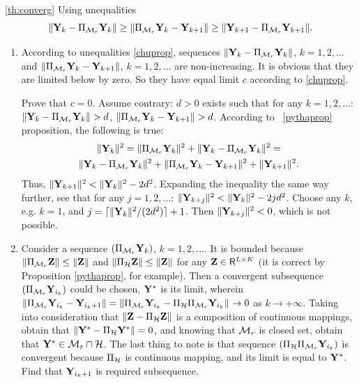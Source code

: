 \documentclass[12pt,a4paper,fleqn,leqno]{article}
\begin{document}
\begin{proof2}{\ref{th:converg}}
Using unequalities \cite{Chu.etal2003}
\begin{equation}
\label{chuprop}
\|\mathbf{Y}_k - \Pi_{\mathcal{M}_r} \mathbf{Y}_k\| \ge \|\Pi_{\mathcal{M}_r} \mathbf{Y}_k - \mathbf{Y}_{k + 1}\| \ge \|\mathbf{Y}_{k+1} - \Pi_{\mathcal{M}_r} \mathbf{Y}_{k + 1}\|.
\end{equation}

\begin{enumerate}
\item According to unequalities \eqref{chuprop}, sequences $\|\mathbf{Y}_k - \Pi_{\mathcal{M}_r} \mathbf{Y}_k\|$, $k = 1, 2, \ldots$ and $\|\Pi_{\mathcal{M}_r} \mathbf{Y}_k - \mathbf{Y}_{k + 1}\|$, $k = 1, 2, \ldots$ are non-increasing. It is obvious that they are limited below by zero. So they have equal limit $c$ according to \eqref{chuprop}.

Prove that $c = 0$. Assume contrary: $d > 0$ exists such that for any $k = 1, 2, \ldots$: $\|\mathbf{Y}_k - \Pi_{\mathcal{M}_r} \mathbf{Y}_k\| > d$, $\|\Pi_{\mathcal{M}_r} \mathbf{Y}_k - \mathbf{Y}_{k + 1}\| > d$. According to ~\ref{pythaprop} proposition, the following is true:
\begin{gather*}
\|\mathbf{Y}_k\|^2 = \|\Pi_{\mathcal{M}_r} \mathbf{Y}_k\|^2 + \|\mathbf{Y}_k - \Pi_{\mathcal{M}_r} \mathbf{Y}_k\|^2 =\\ \|\mathbf{Y}_k - \Pi_{\mathcal{M}_r} \mathbf{Y}_k\|^2 + \|\Pi_{\mathcal{M}_r} \mathbf{Y}_k - \mathbf{Y}_{k + 1}\|^2 + \|\mathbf{Y}_{k + 1}\|^2.
\end{gather*}
Thus, $\|\mathbf{Y}_{k+1}\|^2 < \|\mathbf{Y}_k\|^2 - 2d^2$. Expanding the inequality the same way further, see that for any $j = 1, 2, \ldots$: $\|\mathbf{Y}_{k+j}\|^2 < \|\mathbf{Y}_k\|^2 - 2 j d^2$. Choose any $k$, e.g. $k = 1$, and $j = \lceil \|\mathbf{Y}_k\|^2 / (2d^2) \rceil + 1$. Then $\|\mathbf{Y}_{k+j}\|^2 < 0$, which is not possible.
\item Consider a sequence $(\Pi_{\mathcal{M}_r} \mathbf{Y}_k)$, $k = 1, 2, \ldots$. It is bounded because $\|\Pi_{\mathcal{M}_r} \mathbf{Z}\| \le \|\mathbf{Z}\|$ and $\|\Pi_{\mathcal{H}} \mathbf{Z}\| \le \|\mathbf{Z}\|$ for any $\mathbf{Z} \in \mathsf{R}^{L \times K}$ (it is correct by Proposition \ref{pythaprop}, for example). Then a convergent subsequence $(\Pi_{\mathcal{M}_r} \mathbf{Y}_{i_k})$ could be chosen, $\mathbf{Y}^*$ is its limit, wherein $\|\Pi_{\mathcal{M}_r} \mathbf{Y}_{i_k} - \mathbf{Y}_{i_k + 1}\| = \|\Pi_{\mathcal{M}_r} \mathbf{Y}_{i_k} - \Pi_{\mathcal{H}} \Pi_{\mathcal{M}_r} \mathbf{Y}_{i_k}\| \to 0$ as $k \to + \infty$. Taking into consideration that $\|\mathbf{Z} - \Pi_{\mathcal{H}} \mathbf{Z}\|$ is a composition of continuous mappings, obtain that $\|\mathbf{Y}^* - \Pi_{\mathcal{H}} \mathbf{Y}^*\| = 0$, and knowing that $\mathcal{M}_r$ is closed set, obtain that $\mathbf{Y}^* \in \mathcal{M}_r \cap \mathcal{H}$. The last thing to note is that sequence $(\Pi_{\mathcal{H}} \Pi_{\mathcal{M}_r} \mathbf{Y}_{i_k})$ is convergent because $\Pi_{\mathcal{H}}$ is continuous mapping, and its limit is equal to $\mathbf{Y}^*$. Find that $\mathbf{Y}_{i_k + 1}$ is required subsequence.
\end{enumerate}
\end{proof2}
\end{document}
